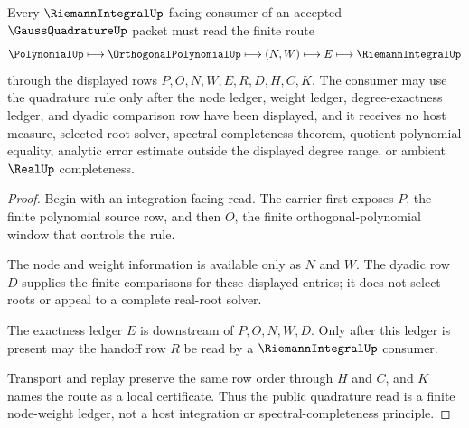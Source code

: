 \begin{theorem}
\label{thm:gauss-quadrature-node-weight-ledger}
Every $\RiemannIntegralUp$-facing consumer of an accepted $\GaussQuadratureUp$ packet must read the finite route
$$
\PolynomialUp \longmapsto \OrthogonalPolynomialUp \longmapsto (N,W) \longmapsto E \longmapsto \RiemannIntegralUp
$$
through the displayed rows $P,O,N,W,E,R,D,H,C,K$. The consumer may use the quadrature rule only after the node ledger, weight ledger, degree-exactness ledger, and dyadic comparison row have been displayed, and it receives no host measure, selected root solver, spectral completeness theorem, quotient polynomial equality, analytic error estimate outside the displayed degree range, or ambient $\RealUp$ completeness.
\end{theorem}
\begin{proof}
Begin with an integration-facing read. The carrier first exposes $P$, the finite polynomial source row, and then $O$, the finite orthogonal-polynomial window that controls the rule.

The node and weight information is available only as $N$ and $W$. The dyadic row $D$ supplies the finite comparisons for these displayed entries; it does not select roots or appeal to a complete real-root solver.

The exactness ledger $E$ is downstream of $P,O,N,W,D$. Only after this ledger is present may the handoff row $R$ be read by a $\RiemannIntegralUp$ consumer.

Transport and replay preserve the same row order through $H$ and $C$, and $K$ names the route as a local certificate. Thus the public quadrature read is a finite node-weight ledger, not a host integration or spectral-completeness principle.
\end{proof}


